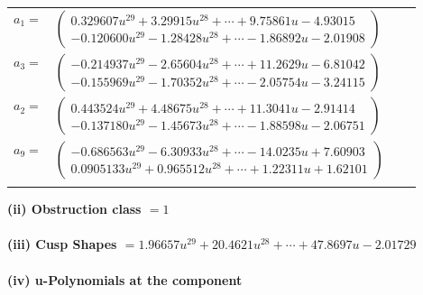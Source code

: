 \documentclass[1p]{elsarticle_modified}
\theoremstyle{definition}
\begin{document}
\begin{tabular}{m{7pt} m{180pt} m{7pt} m{180pt} }
\flushright $a_{1}=$&$\begin{pmatrix}0.329607 u^{29}+3.29915 u^{28}+\cdots+9.75861 u-4.93015\\-0.120600 u^{29}-1.28428 u^{28}+\cdots-1.86892 u-2.01908\end{pmatrix}$ \\
\flushright $a_{3}=$&$\begin{pmatrix}-0.214937 u^{29}-2.65604 u^{28}+\cdots+11.2629 u-6.81042\\-0.155969 u^{29}-1.70352 u^{28}+\cdots-2.05754 u-3.24115\end{pmatrix}$ \\
\flushright $a_{2}=$&$\begin{pmatrix}0.443524 u^{29}+4.48675 u^{28}+\cdots+11.3041 u-2.91414\\-0.137180 u^{29}-1.45673 u^{28}+\cdots-1.88598 u-2.06751\end{pmatrix}$ \\
\flushright $a_{9}=$&$\begin{pmatrix}-0.686563 u^{29}-6.30933 u^{28}+\cdots-14.0235 u+7.60903\\0.0905133 u^{29}+0.965512 u^{28}+\cdots+1.22311 u+1.62101\end{pmatrix}$\\&\end{tabular}
\flushleft \textbf{(ii) Obstruction class $= 1$}\\~\\
\flushleft \textbf{(iii) Cusp Shapes $= 1.96657 u^{29}+20.4621 u^{28}+\cdots+47.8697 u-2.01729$}\\~\\
\newpage\renewcommand{\arraystretch}{1}
\flushleft \textbf{(iv) u-Polynomials at the component}\newline \\
\end{document}
